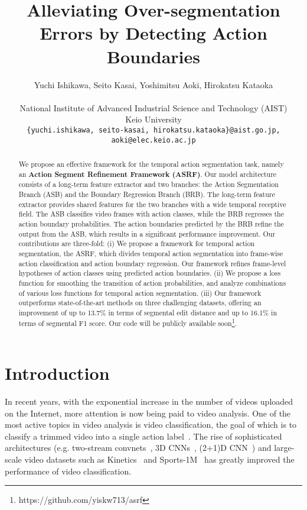 \documentclass[10pt,twocolumn,letterpaper]{article}
\begin{document}
\title{Alleviating Over-segmentation Errors by Detecting Action Boundaries}

\author{
Yuchi Ishikawa, Seito Kasai, Yoshimitsu Aoki, Hirokatsu Kataoka\\
\\National Institute of Advanced Industrial Science and Technology (AIST)\\
Keio University\\
{\tt\small\{yuchi.ishikawa, seito-kasai, hirokatsu.kataoka\}@aist.go.jp, aoki@elec.keio.ac.jp}
}

\maketitle
\begin{abstract}
We propose an effective framework for the temporal action segmentation task, namely an \textbf{Action Segment Refinement Framework (ASRF)}.
Our model architecture consists of a long-term feature extractor and two branches: the Action Segmentation Branch (ASB) and the Boundary Regression Branch (BRB).
The long-term feature extractor provides shared features for the two branches with a wide temporal receptive field.
The ASB classifies video frames with action classes, while the BRB regresses the action boundary probabilities.
The action boundaries predicted by the BRB refine the output from the ASB, which results in a significant performance improvement.
Our contributions are three-fold: (i) We propose a framework for temporal action segmentation, the ASRF,
which divides temporal action segmentation into frame-wise action classification and action boundary regression.
Our framework refines frame-level hypotheses of action classes using predicted action boundaries.
(ii) We propose a loss function for smoothing the transition of action probabilities, and analyze combinations of various loss functions for temporal action segmentation.
(iii) Our framework outperforms state-of-the-art methods on three challenging datasets, offering an improvement of up to 13.7\% in terms of segmental edit distance and up to 16.1\% in terms of segmental F1 score.
Our code will be publicly available soon\footnote{https://github.com/yiskw713/asrf}.
\end{abstract}


\vspace{-5pt}
\section{Introduction}
In recent years, with the exponential increase in the number of videos uploaded on the Internet, more attention is now being paid to video analysis. 
One of the most active topics in video analysis is video classification, the goal of which is to classify a trimmed video into a single action label~\cite{AggarwalCSUR2011}. The rise of sophisticated architectures (e.g. two-stream convnets~\cite{SimonyanNIPS2014,FeichtenhoferCVPR2016}, 3D CNNs~\cite{TranICCV2015,CarreiraCVPR2017,HaraCVPR2018,s3d,slowfast,x3d}, (2+1)D CNN~\cite{TranCVPR2018}) and large-scale video datasets such as Kinetics~\cite{KayarXiv2017,Carreiraarxiv2019} and Sports-1M~\cite{KarpathyCVPR2014} has greatly improved the performance of video classification.
\end{document}
